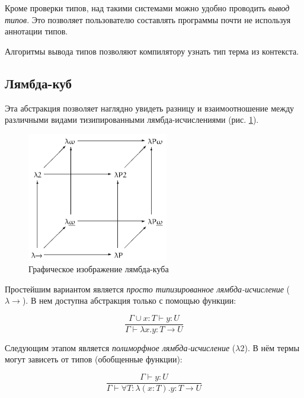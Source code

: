 Кроме проверки типов, над такими системами можно удобно проводить \textit{вывод типов}.
Это позволяет пользователю составлять программы почти не используя аннотации типов.

Алгоритмы вывода типов позволяют компилятору узнать тип терма из контекста.

\subsection{Лямбда-куб}
\label{subsec:lambda_cube}

Эта абстракция позволяет наглядно увидеть разницу и взаимоотношение между различными видами тизипированными лямбда-исчислениями (рис. \ref{fig:lambda_cube}).

\begin{figure}[H]
    \centering
    \includegraphics[width=0.55\textwidth]{figures/Lambda_cube}
    \caption{Графическое изображение лямбда-куба}
    \label{fig:lambda_cube}
\end{figure}

Простейшим вариантом является \textit{просто типизированное лямбда-исчисление} ($\lambda \to$).
В нем доступна абстракция только с помощью функции:

\begin{equation}
    \label{eq:STLC}
    \frac{\Gamma \cup x: T \vdash y: U}{\Gamma \vdash \lambda x.y: T \to U}
\end{equation}

Следующим этапом является \textit{полиморфное лямбда-исчисление} ($\lambda 2$).
В нём термы могут зависеть от типов (обобщенные функции):

\begin{equation}
    \label{eq:2TLC}
    \frac{\Gamma \vdash y: U}{\Gamma \vdash \forall T: \lambda (x: T).y: T \to U}
\end{equation}

